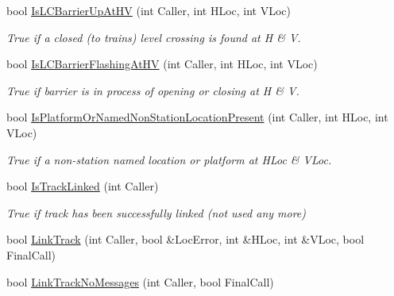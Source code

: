 \begin{DoxyCompactItemize}
\mbox{\label{class_t_track_a7331fe3693d4a1f2aa76817e66fba995}} 
bool \mbox{\hyperlink{class_t_track_a7331fe3693d4a1f2aa76817e66fba995}{Is\+L\+C\+Barrier\+Up\+At\+HV}} (int Caller, int H\+Loc, int V\+Loc)
\begin{DoxyCompactList}\small\item\em True if a closed (to trains) level crossing is found at H \& V. \end{DoxyCompactList}\item 
\mbox{\label{class_t_track_a96468affb70f97173d882afefbec9fb2}} 
bool \mbox{\hyperlink{class_t_track_a96468affb70f97173d882afefbec9fb2}{Is\+L\+C\+Barrier\+Flashing\+At\+HV}} (int Caller, int H\+Loc, int V\+Loc)
\begin{DoxyCompactList}\small\item\em True if barrier is in process of opening or closing at H \& V. \end{DoxyCompactList}\item 
\mbox{\label{class_t_track_adbec6561f4ecd2fa1dabf3e41502b085}} 
bool \mbox{\hyperlink{class_t_track_adbec6561f4ecd2fa1dabf3e41502b085}{Is\+Platform\+Or\+Named\+Non\+Station\+Location\+Present}} (int Caller, int H\+Loc, int V\+Loc)
\begin{DoxyCompactList}\small\item\em True if a non-\/station named location or platform at H\+Loc \& V\+Loc. \end{DoxyCompactList}\item 
\mbox{\label{class_t_track_ac0c7fcb151e24dd265a94136db9b6a58}} 
bool \mbox{\hyperlink{class_t_track_ac0c7fcb151e24dd265a94136db9b6a58}{Is\+Track\+Linked}} (int Caller)
\begin{DoxyCompactList}\small\item\em True if track has been successfully linked (not used any more) \end{DoxyCompactList}\item 
bool \mbox{\hyperlink{class_t_track_a17b6095b0c8de0e1493eeebd6d534247}{Link\+Track}} (int Caller, bool \&Loc\+Error, int \&H\+Loc, int \&V\+Loc, bool Final\+Call)
\item 
bool \mbox{\hyperlink{class_t_track_a42f410832651458a4a34769ef95be51b}{Link\+Track\+No\+Messages}} (int Caller, bool Final\+Call)
\item 

\end{DoxyCompactItemize}
